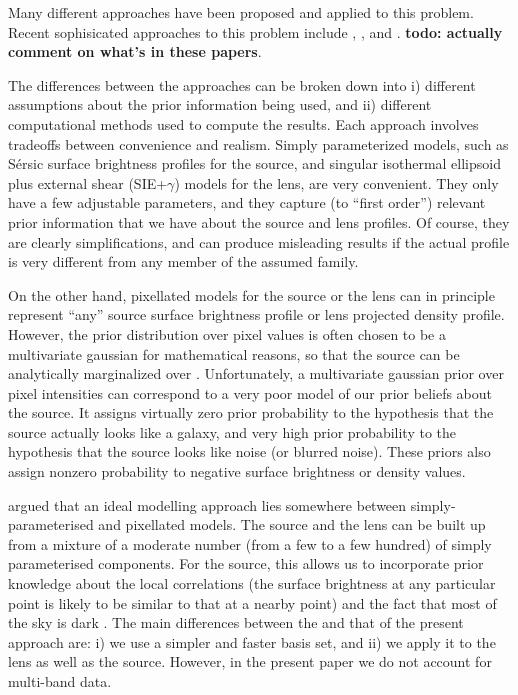 \documentclass[useAMS,usenatbib]{mn2e}
\begin{document}
Many different approaches have been proposed and applied to
this problem. Recent sophisicated approaches to
this problem include \citet{2014MNRAS.445.2181C},
\citet{2015arXiv150500198T}, and
\citet{2015arXiv150407629B}. {\bf todo: actually comment
on what's in these papers}.



The differences between the approaches can be broken down into
i) different assumptions about the prior information being used, and ii)
different computational methods used to compute the results.
Each approach involves tradeoffs between convenience and realism.
Simply parameterized models, such as Sérsic surface
brightness profiles for the source, and singular isothermal ellipsoid plus
external shear (SIE+$\gamma$) models for the lens, are very
convenient. They only have a few adjustable parameters, and they capture
(to ``first order'') relevant prior information that we have about the
source and lens profiles. Of course, they are clearly simplifications,
and can produce misleading results if the actual profile is very different
from any member of the assumed family.

On the
other hand, pixellated models for the source \citep[e.g.][]{suyu} or the lens
\citep[e.g.][]{2014MNRAS.445.2181C} can in principle represent ``any''
source surface brightness profile or lens projected density profile. However, the prior
distribution over pixel values is often chosen to be a multivariate gaussian
for mathematical reasons, so
that the source can be analytically marginalized over
\citep{2003ApJ...590..673W}. Unfortunately, a multivariate gaussian prior
over pixel intensities can correspond to a very poor model of our prior
beliefs about the source. It assigns virtually zero prior probability
to the hypothesis that the source actually looks like a galaxy, and very high
prior probability to the hypothesis that the source looks like noise (or
blurred noise). These priors also assign nonzero probability to negative
surface brightness or density values.

\citet{2011MNRAS.412.2521B} argued that an ideal
modelling approach lies somewhere between simply-parameterised and
pixellated models.
The source and the lens can be built up from a mixture of a moderate
number (from a few to a few hundred) of
simply parameterised components. For the source, this allows
us to incorporate prior knowledge about the local correlations (the surface
brightness at any particular point is likely to be similar to that at a
nearby point) and the fact that most of the sky is
dark \citep{2006ApJ...637..608B}. The main differences between the
\citet{2011MNRAS.412.2521B} and that of the present approach are:
i) we use a simpler and faster basis set, and ii) we apply it to the lens
as well as the source. However, in the present paper we do not account for
multi-band data.
\end{document}
